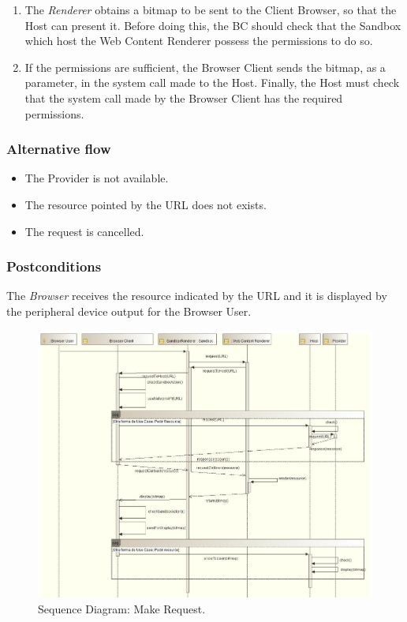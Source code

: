 \documentclass{sig-alternate-05-2015}
\begin{document}
\begin{enumerate}
        \item The \textit {Renderer} obtains a bitmap to be sent to the Client Browser, so that the Host can present it. Before doing this, the BC should check that the Sandbox which host the Web Content Renderer possess the permissions to do so.
        \item If the permissions are sufficient, the Browser Client sends the bitmap, as a parameter, in the system call made to the Host. Finally, the Host must check that the system call made by the Browser Client has the required permissions.
      \end{enumerate}
    \subsubsection*{Alternative flow} 
    \begin{itemize}
    \item The Provider is not available.
    \item The resource pointed by the URL does not exists.
    \item The request is cancelled.
      \end{itemize}
    \subsubsection*{Postconditions} The \textit{Browser} receives the resource indicated by the URL and it is displayed by the peripheral device output for the Browser User.
      \begin{figure}[h!t]
          \centering
          \includegraphics[scale=0.61]{figures/realizarRequest_v3.jpg}
          \caption{Sequence Diagram: Make Request.}
          \label{fig:SecReq}
      \end{figure}
\end{document}
